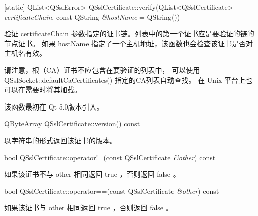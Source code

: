 [static] QList<QSslError> QSslCertificate::verify(QList<QSslCertificate> 
\emph{certificateChain}, const QString \emph{\&hostName} = QString())

验证 certificateChain 参数指定的证书链。列表中的第一个证书应是要验证的链的节点证书。
如果 hostName 指定了一个主机地址，该函数也会检查该证书是否对主机名有效。

请注意，根（CA）证书不应包含在要验证的列表中，
可以使用 QSslSocket::defaultCaCertificates() 指定的CA列表自动查找。
在 Unix 平台上也可以在需要时将其加载。

该函数最初在 Qt 5.0版本引入。

QByteArray QSslCertificate::version() const

以字符串的形式返回该证书的版本。

bool QSslCertificate::operator!=(const QSslCertificate \emph{\&other}) const

如果该证书不与 other 相同返回 true ，否则返回 false 。

bool QSslCertificate::operator==(const QSslCertificate \emph{\&other}) const

如果该证书与 other 相同返回 true ，否则返回 false 。